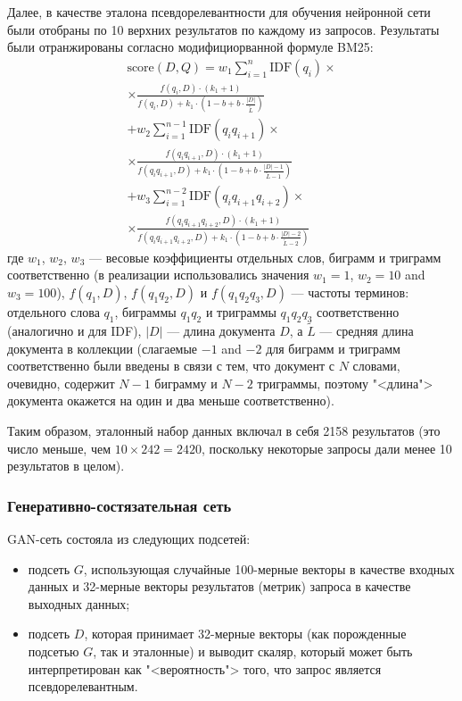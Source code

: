 Далее, в качестве эталона псевдорелевантности для обучения нейронной сети были отобраны по 10 верхних результатов по каждому из
запросов. Результаты были отранжированы согласно модифициорванной формуле BM25:
\begin{equation}
    \label{eq:wbm25}
    \begin{aligned}
    \text{score}(D,Q) = w_1 \sum_{i=1}^{n} \text{IDF}(q_i) \times \\ \times \frac{f(q_i, D) \cdot (k_1 + 1)}{f(q_i, D) + k_1 \cdot \left(1 - b + b \cdot \frac{|D|}{\tilde{L}}\right)} \\
    + w_2  \sum_{i=1}^{n-1} \text{IDF}(q_i q_{i+1}) \times \\ \times \frac{f(q_i q_{i+1}, D) \cdot (k_1 + 1)}{f(q_i q_{i+1}, D) + k_1 \cdot \left(1 - b + b \cdot \frac{|D| - 1}{\tilde{L} - 1}\right)} \\
    + w_3  \sum_{i=1}^{n-2} \text{IDF}(q_i q_{i+1}q_{i+2}) \times \\ \times \frac{f(q_i q_{i+1}q_{i+2}, D) \cdot (k_1 + 1)}{f(q_i q_{i+1}q_{i+2}, D) + k_1 \cdot \left(1 - b + b \cdot \frac{|D| - 2}{\tilde{L} - 2}\right)}
    \end{aligned}
\end{equation}
где \(w_1\), \(w_2\), \(w_3\) --- весовые коэффициенты отдельных слов, биграмм и триграмм соответственно (в реализации 
использовались значения \(w_1=1\), \(w_2=10\) and \(w_3=100\)), \(f(q_1, D)\), \(f(q_1q_2, D)\) и \(f(q_1q_2q_3, D)\) --- 
частоты терминов: отдельного слова \(q_1\), биграммы \(q_1q_2\) и триграммы \(q_1q_2q_3\) соответственно (аналогично и для IDF),
 \(|D|\) --- длина документа \(D\), а \(\tilde{L}\) --- средняя длина документа в коллекции (слагаемые \(-1\) and \(-2\) 
для биграмм и триграмм соответственно были введены в связи с тем, что документ с \(N\) словами, очевидно, содержит 
\(N-1\) биграмму и \(N-2\) триграммы, поэтому "<длина"> документа окажется на один и два меньше соответственно).

Таким образом, эталонный набор данных включал в себя 2158 результатов
(это число меньше, чем $10\times242=2420$, поскольку некоторые запросы дали менее 10 результатов в целом).

\subsubsection{Генеративно-состязательная сеть}
GAN-сеть состояла из следующих подсетей:
\begin{itemize}
    \item подсеть $G$, использующая случайные 100-мерные векторы в качестве входных данных 
    и 32-мерные векторы результатов (метрик) запроса в качестве выходных данных;
    \item подсеть $D$, которая принимает 32-мерные векторы (как порожденные подсетью $G$, так и эталонные) и выводит скаляр, 
    который может быть интерпретирован как "<вероятность"> того, что запрос является псевдорелевантным.
\end{itemize}

